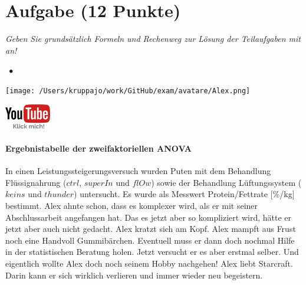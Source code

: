 \documentclass[a4paper, 9pt]{scrartcl}\usepackage[]{graphicx}\usepackage[]{xcolor}
\begin{document}
 
\clearpage

\section{Aufgabe \hfill (12 Punkte)}

\textit{Geben Sie grundsätzlich Formeln und Rechenweg zur Lösung der Teilaufgaben mit an!} \\[1Ex]
 

 
\ifcollection
\begin{flushright}
\tiny\vspace{-3Ex}
\textbf{\examinhaltstart}
\exammodulestatversuch $\;\bullet$
\exammodulebiostat
\vspace{-4Ex}
\end{flushright}
\begin{minipage}[t]{0.5\textwidth}
\texttt{[image: /Users/kruppajo/work/GitHub/exam/avatare/Alex.png]}
\end{minipage}
\begin{minipage}[t]{0.5\textwidth}
\hfill
\href{https://youtu.be/8Pb2sKUIMyk}{\includegraphics[width = 2cm]{img/youtube}}
\end{minipage}
\vspace{-3Ex}
\fi



\ifcollection
\paragraph{Ergebnistabelle der zweifaktoriellen ANOVA}
\fi

In einen Leistungssteigerungsversuch wurden Puten mit dem Behandlung Flüssignahrung ($ctrl$, $superIn$ und $flOw$) sowie der Behandlung Lüftungssystem ($keins$ und $thunder$) untersucht. Es wurde als Messwert Protein/Fettrate [\%/kg] bestimmt. Alex ahnte schon, dass es komplexer wird, als er mit seiner Abschlussarbeit angefangen hat. Das es jetzt aber so kompliziert wird, hätte er jetzt aber auch nicht gedacht. Alex kratzt sich am Kopf. Alex mampft aus Frust noch eine Handvoll Gummibärchen. Eventuell muss er dann doch nochmal Hilfe in der statistischen Beratung holen. Jetzt versucht er es aber erstmal selber. Und eigentlich wollte Alex doch noch seinem Hobby nachgehen! Alex liebt Starcraft. Darin kann er sich wirklich verlieren und immer wieder neu begeistern.
\end{document}
